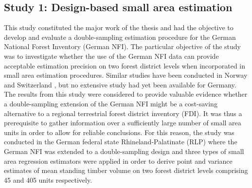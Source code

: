 \subsection{Study 1: Design-based small area estimation}
\label{sec:study1}


This study constituted the major work of the thesis and had the objective to develop and evaluate a double-sampling estimation procedure for the German National Forest Inventory (German NFI). The particular objective of the study was to investigate whether the use of the German NFI data can provide acceptable estimation precision on two forest district levels when incorporated in small area estimation procedures. Similar studies have been conducted in Norway \citep{breidenbach2012} and Switzerland \citep{magnussen2014a, steinmann2013}, but no extensive study had yet been available for Germany. The results from this study were considered to provide valuable evidence whether a double-sampling extension of the German NFI might be a cost-saving alternative to a regional terrestrial forest district inventory (FDI). It was thus a prerequisite to gather information over a sufficiently large number of small area units in order to allow for reliable conclusions. For this reason, the study was conducted in the German federal state Rhineland-Palatinate (RLP) where the German NFI was extended to a double-sampling design and three types of small area regression estimators were applied in order to derive point and variance estimates of mean standing timber volume on two forest district levels comprising 45 and 405 units respectively.\par

